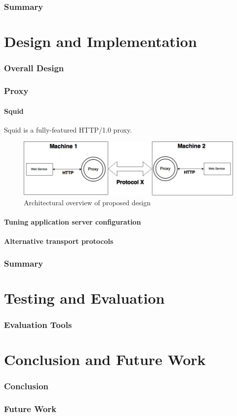 \documentclass[USenglish]{article}
\begin{document}
\section{Summary}



\part{Design and Implementation}
\section{Overall Design}
\section{Proxy}
\subsection{Squid}
Squid is a fully-featured HTTP/1.0 proxy.
\begin{figure}[h]
\includegraphics[scale=0.4]{images/architecture.png}
\caption{Architectural overview of proposed design}
\end{figure}



\subsection{Tuning application server configuration}

\subsection{Alternative transport protocols}

\section{Summary}

\part{Testing and Evaluation}
\section{Evaluation Tools}

\part{Conclusion and Future Work}
\section{Conclusion}

\section{Future Work}

\pagebreak
\printbibliography{}
\printglossary
\end{document}
